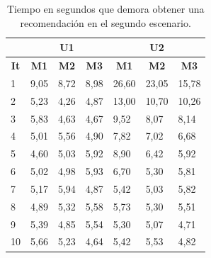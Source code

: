 \begin{table}[H]
  \begin{center}
    \caption{Tiempo en segundos que demora obtener una recomendación en el segundo escenario.}
    \label{tab:res-tab02}
    \begin{tabular}{|l|l|l|l|l|l|l|}
      \hline
       & \multicolumn{3}{c|}{\textbf{U1}} & \multicolumn{3}{c|}{\textbf{U2}} \\ \hline
      \multicolumn{1}{|c|}{\textbf{It}} & \multicolumn{1}{c|}{\textbf{M1}} & \multicolumn{1}{c|}{\textbf{M2}} & \multicolumn{1}{c|}{\textbf{M3}} & \multicolumn{1}{c|}{\textbf{M1}} & \multicolumn{1}{c|}{\textbf{M2}} & \multicolumn{1}{c|}{\textbf{M3}} \\ \hline
      1 & 9,05 & 8,72 & 8,98 & 26,60 & 23,05 & 15,78 \\ \hline
      2 & 5,23 & 4,26 & 4,87 & 13,00 & 10,70 & 10,26 \\ \hline
      3 & 5,83 & 4,63 & 4,67 & 9,52 & 8,07 & 8,14 \\ \hline
      4 & 5,01 & 5,56 & 4,90 & 7,82 & 7,02 & 6,68 \\ \hline
      5 & 4,60 & 5,03 & 5,92 & 8,90 & 6,42 & 5,92 \\ \hline
      6 & 5,02 & 4,98 & 5,93 & 6,70 & 5,30 & 5,81 \\ \hline
      7 & 5,17 & 5,94 & 4,87 & 5,42 & 5,03 & 5,82 \\ \hline
      8 & 4,89 & 5,32 & 5,58 & 5,73 & 5,30 & 5,51 \\ \hline
      9 & 5,39 & 4,85 & 5,54 & 5,30 & 5,07 & 4,71 \\ \hline
      10 & 5,66 & 5,23 & 4,64 & 5,42 & 5,53 & 4,82 \\ \hline
    \end{tabular}
  \end{center}
\end{table}

